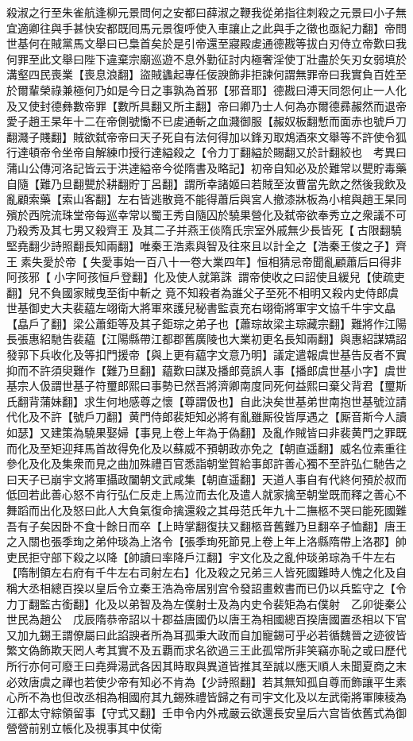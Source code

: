 殺淑之行至朱雀航逢柳元景問何之安都曰薛淑之鞭我從弟指往刺殺之元景曰小子無宜適卿往與手甚快安都既囘馬元景復呼使入車讓止之此與手之徵也亟紀力翻】帝問世基何在賊黨馬文舉曰已梟首矣於是引帝還至寢殿䖍通德戡等拔白刃侍立帝歎曰我何罪至此文舉曰陛下違棄宗廟巡遊不息外勤征討内極奢淫使丁壯盡於矢刃女弱填於溝壑四民喪業【喪息浪翻】盜賊蠭起專任佞諛飾非拒諫何謂無罪帝曰我實負百姓至於爾輩榮祿兼極何乃如是今日之事孰為首邪【邪音耶】德戡曰溥天同怨何止一人化及又使封德彝數帝罪【數所具翻又所主翻】帝曰卿乃士人何為亦爾德彞赧然而退帝愛子趙王杲年十二在帝側號慟不已䖍通斬之血濺御服【赧奴板翻慙而面赤也號戶刀翻濺子賤翻】賊欲弑帝帝曰天子死自有法何得加以鋒刃取鴆酒來文舉等不許使令狐行達頓帝令坐帝自解練巾授行達縊殺之【令力丁翻縊於賜翻又於計翻絞也　考異曰蒲山公傳河洛記皆云于洪達縊帝今從隋書及略記】初帝自知必及於難常以甖貯毒藥自隨【難乃旦翻甖於耕翻貯丁呂翻】謂所幸諸姬曰若賊至汝曹當先飲之然後我飲及亂顧索藥【索山客翻】左右皆逃散竟不能得蕭后與宮人撤漆牀板為小棺與趙王杲同殯於西院流珠堂帝每巡幸常以蜀王秀自隨囚於驍果營化及弑帝欲奉秀立之衆議不可乃殺秀及其七男又殺齊王及其二子并燕王倓隋氏宗室外戚無少長皆死【古限翻驍堅堯翻少詩照翻長知兩翻】唯秦王浩素與智及往來且以計全之【浩秦王俊之子】齊王素失愛於帝【失愛事始一百八十一卷大業四年】恒相猜忌帝聞亂顧蕭后曰得非阿孩邪【小字阿孩恒戶登翻】化及使人就第誅謂帝使收之曰詔使且緩兒【使疏吏翻】兒不負國家賊曳至街中斬之竟不知殺者為誰父子至死不相明又殺内史侍郎虞世基御史大夫裴藴左翊衛大將軍來護兒秘書監袁充右翊衛將軍宇文協千牛宇文皛【皛戶了翻】梁公蕭鉅等及其子鉅琮之弟子也【蕭琮故梁主琮藏宗翻】難將作江陽長張惠紹馳告裴藴【江陽縣帶江都郡舊廣陵也大業初更名長知兩翻】與惠紹謀矯詔發郭下兵收化及等扣門援帝【與上更有藴字文意乃明】議定遣報虞世基告反者不實抑而不許須臾難作【難乃旦翻】藴歎曰謀及播郎竟誤人事【播郎虞世基小字】虞世基宗人伋謂世基子符璽郎熙曰事勢已然吾將濟卿南度同死何益熙曰棄父背君【璽斯氏翻背蒲妹翻】求生何地感尊之懷【尊謂伋也】自此決矣世基弟世南抱世基號泣請代化及不許【號戶刀翻】黄門侍郎裴矩知必將有亂雖厮役皆厚遇之【厮音斯今人讀如瑟】又建策為驍果娶婦【事見上卷上年為于偽翻】及亂作賊皆曰非裴黄門之罪既而化及至矩迎拜馬首故得免化及以蘇威不預朝政亦免之【朝直遥翻】威名位素重往參化及化及集衆而見之曲加殊禮百官悉詣朝堂賀給事郎許善心獨不至許弘仁馳告之曰天子已崩宇文將軍攝政闔朝文武咸集【朝直遥翻】天道人事自有代終何預於叔而低回若此善心怒不肯行弘仁反走上馬泣而去化及遣人就家擒至朝堂既而釋之善心不舞蹈而出化及怒曰此人大負氣復命擒還殺之其母范氏年九十二撫柩不哭曰能死國難吾有子矣因卧不食十餘日而卒【上時掌翻復扶又翻柩音舊難乃旦翻卒子恤翻】唐王之入關也張季珣之弟仲琰為上洛令【張季珣死節見上卷上年上洛縣隋帶上洛郡】帥吏民拒守部下殺之以降【帥讀曰率降戶江翻】宇文化及之亂仲琰弟琮為千牛左右【隋制領左右府有千牛左右司射左右】化及殺之兄弟三人皆死國難時人愧之化及自稱大丞相總百揆以皇后令立秦王浩為帝居别宫令發詔畫敕書而已仍以兵監守之【令力丁翻監古銜翻】化及以弟智及為左僕射士及為内史令裴矩為右僕射　乙卯徙秦公世民為趙公　戊辰隋恭帝詔以十郡益唐國仍以唐王為相國總百揆唐國置丞相以下官又加九錫王謂僚屬曰此諂諛者所為耳孤秉大政而自加寵錫可乎必若循魏晉之迹彼皆繁文偽飾欺天罔人考其實不及五覇而求名欲過三王此孤常所非笑竊亦恥之或曰歷代所行亦何可廢王曰堯舜湯武各因其時取與異道皆推其至誠以應天順人未聞夏商之末必效唐虞之禪也若使少帝有知必不肯為【少詩照翻】若其無知孤自尊而飾讓平生素心所不為也但改丞相為相國府其九錫殊禮皆歸之有司宇文化及以左武衛將軍陳稜為江都太守綜領留事【守式又翻】壬申令内外戒嚴云欲還長安皇后六宫皆依舊式為御營營前别立帳化及視事其中仗衛